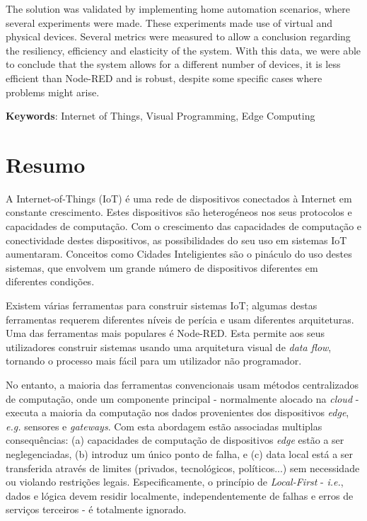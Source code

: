 The solution was validated by implementing home automation scenarios, where several experiments were made. These experiments made use of virtual and physical devices. Several metrics were measured to allow a conclusion regarding the resiliency, efficiency and elasticity of the system. With this data, we were able to conclude that the system allows for a different number of devices, it is less efficient than Node-RED and is robust, despite some specific cases where problems might arise.

\vspace*{10mm}\noindent
\textbf{Keywords}: Internet of Things, Visual Programming, Edge Computing

\chapter*{Resumo}

A Internet-of-Things (IoT) é uma rede de dispositivos conectados à Internet em constante crescimento. Estes dispositivos são heterogéneos nos seus protocolos e capacidades de computação. Com o crescimento das capacidades de computação e conectividade destes dispositivos, as possibilidades do seu uso em sistemas IoT aumentaram. Conceitos como Cidades Inteligientes são o pináculo do uso destes sistemas, que envolvem um grande número de dispositivos diferentes em diferentes condições.

Existem várias ferramentas para construir sistemas IoT; algumas destas ferramentas requerem diferentes níveis de perícia e usam diferentes arquiteturas. Uma das ferramentas mais populares é Node-RED. Esta permite aos seus utilizadores construir sistemas usando uma arquitetura visual de \emph{data flow}, tornando o processo mais fácil para um utilizador não programador.
\par No entanto, a maioria das ferramentas convencionais usam métodos centralizados de computação, onde um componente principal - normalmente alocado na \emph{cloud} - executa a maioria da computação nos dados provenientes dos dispositivos \emph{edge}, \emph{e.g.} sensores e \emph{gateways}. Com esta abordagem estão associadas multiplas consequências: (a) capacidades de computação de dispositivos \emph{edge} estão a ser neglegenciadas, (b) introduz um único ponto de falha, e (c) data local está a ser transferida através de limites (privados, tecnológicos, políticos...) sem necessidade ou violando restrições legais. Especificamente, o princípio de \emph{Local-First} - \emph{i.e.}, dados e lógica devem residir localmente, independentemente de falhas e erros de serviços terceiros - é totalmente ignorado.

